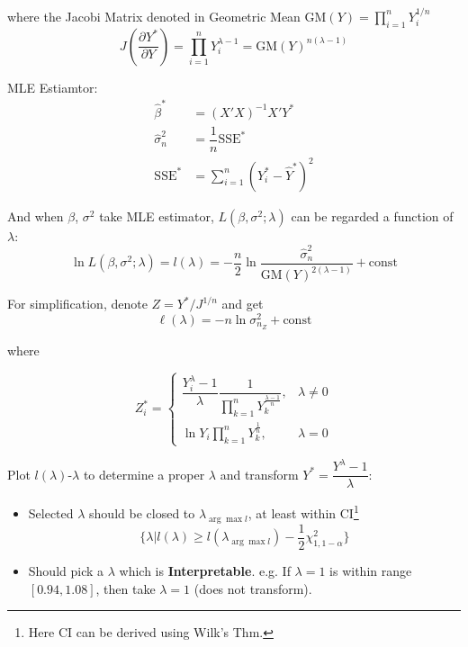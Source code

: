 \begin{itemize}[topsep=2pt,itemsep=2pt]
            where the Jacobi Matrix denoted in Geometric Mean $ \mathrm{GM}(Y)=\prod_{i=1}^n Y_i^{1/n}$
            \begin{equation}
                J(\dfrac{\partial^{} Y^*}{\partial Y^{}})=\prod_{i=1}^nY_i^{\lambda -1}=\mathrm{GM}(Y)^{n(\lambda -1)}
            \end{equation}
            
            
    
            MLE Estiamtor:
            \begin{align*}
                \hat{\beta }^*&= (X'X)^{-1}X'Y^*\\
                \hat{\sigma }^2_n&=\dfrac{1}{n}\mathrm{SSE}^*\\
                \mathrm{SSE}^*&=\sum_{i=1}^n(Y_i^*-\hat{Y}^*)^2
            \end{align*}
    
            And when $ \beta  $, $ \sigma ^2 $ take MLE estimator, $ L(\beta ,\sigma ^2;\lambda ) $ can be regarded a function of $ \lambda  $:
            \begin{equation}
                \ln L(\beta ,\sigma ^2;\lambda )=l(\lambda )=-\dfrac{n}{2}\ln \dfrac{\hat{\sigma}^2_n}{\mathrm{GM}(Y)^{2(\lambda -1)}}+\mathrm{const}
            \end{equation}
    
            For simplification, denote $ Z=Y^*/J^{1/n} $ and get
            \begin{equation}
                \ell (\lambda )=-n\ln \sigma^2_{n_Z}+\mathrm{const} 
            \end{equation}
            
            where 
    
            \begin{equation}
                Z_i^* =\begin{cases}
                    \dfrac{Y_i^\lambda-1 }{\lambda }\dfrac{1}{\prod\limits_{k=1}^n Y_k^{\frac{\lambda -1}{n}}},&\lambda \neq 0\\
                    \ln Y_i\prod\limits_{k=1}^n Y_k^{\frac{1}{n}},&\lambda =0
                \end{cases}
            \end{equation}
    
            Plot $ l(\lambda ) $-$ \lambda  $ to determine a proper $ \lambda  $ and transform $ Y^*=\dfrac{Y^\lambda -1}{\lambda } $:
            \begin{itemize}[topsep=2pt,itemsep=2pt]
                \item Selected $ \lambda $ should be closed to $ \lambda_{\arg\max l} $, at least within CI\footnote{Here CI can be derived using Wilk's Thm.}
                \begin{equation}
                    \{\lambda |l(\lambda )\geq l(\lambda_{\arg\max l})-\dfrac{1}{2}\chi^2_{1,1-\alpha }\}
                \end{equation}
                \item Should pick a $ \lambda  $ which is \textbf{Interpretable}. e.g. If $ \lambda =1 $ is within range $ [0.94,1.08] $, then take $ \lambda =1 $ (does not transform).
                

\end{itemize}
\end{itemize}
